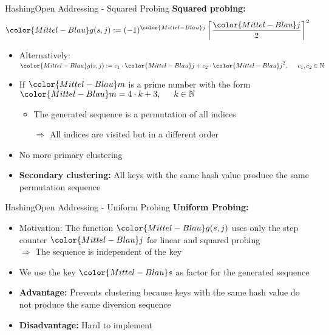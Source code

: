 
\begin{frame}{Hashing}{Open Addressing - Squared Probing}
  \textbf{Squared probing:}
  \begin{displaymath}
    {\color{Mittel-Blau}g(s,j)}
    := (-1)^{\color{Mittel-Blau}j}
    \left\lceil \frac{{\color{Mittel-Blau}j}}{2} \right\rceil^2
  \end{displaymath}
  \vspace{-1.0em}
  \begin{itemize}
    \item
      Alternatively:
      \begin{math}
        {\color{Mittel-Blau}g(s,j)}
        := c_1 \cdot {\color{Mittel-Blau}j}
        + c_2 \cdot {\color{Mittel-Blau}j}^2,
        \hspace{1.5em} c_1, c_2 \in \mathbb{N}
      \end{math}
    \item
      If ${\color{Mittel-Blau}m}$ is a prime number with the form
      \begin{math}
        {\color{Mittel-Blau}m} = 4 \cdot k + 3,
        \hspace{1.5em} k \in \mathbb{N}
      \end{math}
      \begin{itemize}
        \item
          The generated sequence is a permutation of all indices
        \item[$\Rightarrow$]
          All indices are visited but in a different order
      \end{itemize}
    \item
      No more primary clustering
    \item
      \textbf{Secondary clustering:}
      All keys with the same hash value produce the same permutation sequence
  \end{itemize}
\end{frame}


\begin{frame}{Hashing}{Open Addressing - Uniform Probing}
  \textbf{Uniform Probing:}
  \begin{itemize}
    \item
      Motivation: The function ${\color{Mittel-Blau}g(s,j)}$ uses only the step
      counter ${\color{Mittel-Blau}j}$ for linear and squared probing\\
      $\Rightarrow$ The sequence is independent of the {\color{Mittel-Blau}key}
    \item
      We use the key ${\color{Mittel-Blau}s}$ as factor for the generated
      sequence
    \item
      \textbf{Advantage:}
      Prevents clustering because keys with the same hash value do not produce
      the same diversion sequence
    \item
      \textbf{Disadvantage:}
      Hard to implement
  \end{itemize}
\end{frame}

